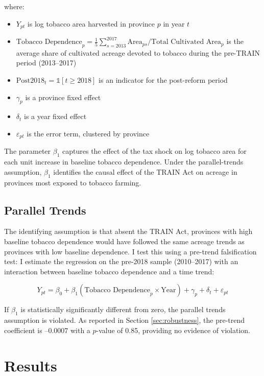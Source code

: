 \documentclass[12pt]{article}
\begin{document}
where:
\begin{itemize}
\item $Y_{pt}$ is log tobacco area harvested in province $p$ in year $t$
\item $\text{Tobacco Dependence}_p = \frac{1}{5}\sum_{s=2013}^{2017} \text{Area}_{ps} / \text{Total Cultivated Area}_p$ is the average share of cultivated acreage devoted to tobacco during the pre-TRAIN period (2013--2017)
\item $\text{Post2018}_t = \mathbb{1}[t \geq 2018]$ is an indicator for the post-reform period
\item $\gamma_p$ is a province fixed effect
\item $\delta_t$ is a year fixed effect
\item $\varepsilon_{pt}$ is the error term, clustered by province
\end{itemize}

The parameter $\beta_1$ captures the effect of the tax shock on log tobacco area for each unit increase in baseline tobacco dependence. Under the parallel-trends assumption, $\beta_1$ identifies the causal effect of the TRAIN Act on acreage in provinces most exposed to tobacco farming.

\subsection{Parallel Trends}

The identifying assumption is that absent the TRAIN Act, provinces with high baseline tobacco dependence would have followed the same acreage trends as provinces with low baseline dependence. I test this using a pre-trend falsification test: I estimate the regression on the pre-2018 sample (2010--2017) with an interaction between baseline tobacco dependence and a time trend:

\begin{equation}
Y_{pt} = \beta_0 + \beta_1 (\text{Tobacco Dependence}_p \times \text{Year}) + \gamma_p + \delta_t + \varepsilon_{pt}
\end{equation}

If $\beta_1$ is statistically significantly different from zero, the parallel trends assumption is violated. As reported in Section \ref{sec:robustness}, the pre-trend coefficient is --0.0007 with a $p$-value of 0.85, providing no evidence of violation.

\section{Results} \label{sec:results}
\end{document}
